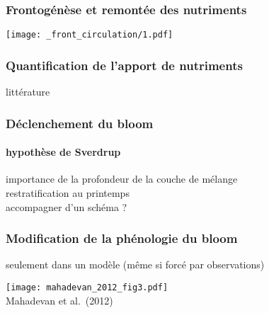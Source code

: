 \documentclass[11pt, french, aspectratio=32]{beamer}
\begin{document}

\begin{frame}
  \frametitle{Frontogénèse et remontée des nutriments}
  \centering
  \texttt{[image: \_front\_circulation/1.pdf]}%

\end{frame}


\begin{frame}
  \frametitle{Quantification de l'apport de nutriments}

  littérature

\end{frame}


\begin{frame}
  \frametitle{Déclenchement du bloom}
  \framesubtitle{hypothèse de Sverdrup}
  importance de la profondeur de la couche de mélange
  \\[1em]

  restratification au printemps
  \\[1em]

  accompagner d'un schéma ?
\end{frame}


\begin{frame}
  \frametitle{Modification de la phénologie du bloom}
  seulement dans un modèle (même si forcé par observations)

  \begin{block}{}
    \texttt{[image: mahadevan\_2012\_fig3.pdf]}
    \\
    Mahadevan et al.\ (2012)
  \end{block}
\end{frame}

\end{document}
